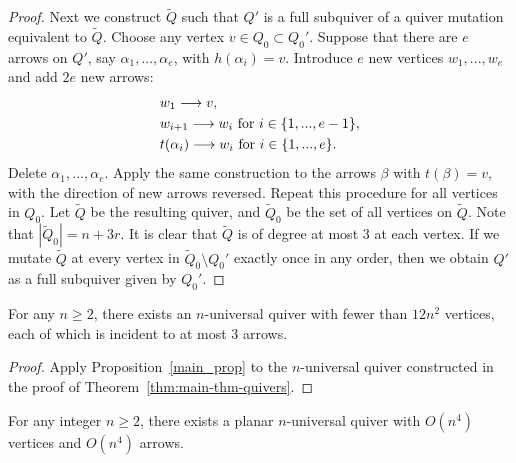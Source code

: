 \documentclass[ALCO,ThmDefs,Unicode,epreuves,published]{cedram}
\begin{document}
\begin{proof}
Next we construct $\widetilde{Q}$ such that $Q'$ is a full subquiver of a quiver mutation equivalent to $\widetilde{Q}$.
Choose any vertex $v\in Q_0\subset Q_0'$. Suppose that there are $e$ arrows on $Q'$, say $\alpha_1,...,\alpha_e$, with $h(\alpha_i)=v$. Introduce $e$ new vertices $w_1,...,w_e$ and add $2e$ new arrows:
$$\aligned
&w_1\longrightarrow v,\\
&w_{i+1}\longrightarrow w_i\text{ for }i\in\{1,...,e-1\},\\
&t(\alpha_i)\longrightarrow w_i\text{ for }i\in\{1,...,e\}.
\endaligned$$ 
Delete $\alpha_1,...,\alpha_e$. Apply the same construction to the arrows $\beta$ with $t(\beta)=v$, with the direction of new arrows reversed. Repeat this procedure for all vertices in $Q_0$. Let $\widetilde{Q}$ be the resulting quiver, and $\widetilde{Q}_0$ be the set of all vertices on $\widetilde{Q}$. Note that $|\widetilde{Q}_0|=n+3r$. It is clear that $\widetilde{Q}$ is of degree at most 3 at each vertex. If we mutate $\widetilde{Q}$ at every vertex in $ \widetilde{Q}_0\setminus Q_0'$ exactly once in any order, then we obtain $Q'$ as a full subquiver given by $Q_0'$.
\fi
\end{proof}

\begin{corollary}
\label{main_thm2}
For any $n\ge 2$, there exists an $n$-universal quiver with fewer than $12n^2$ vertices, each of which is incident to at most 3 arrows. 
\end{corollary}

\begin{proof}
Apply Proposition~\ref{main_prop} to the $n$-universal quiver constructed in the proof of Theorem~\ref{thm:main-thm-quivers}.
\end{proof}

\begin{theorem}
\label{thm:planar-universal}
For any integer $n\ge 2$, there exists a planar $n$-universal quiver with $O(n^4)$ vertices and $O(n^4)$ arrows. 
\end{theorem}
\end{document}
